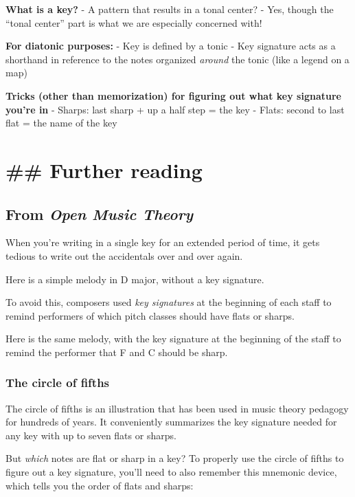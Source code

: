 \documentclass{book}
\begin{document}
\textbf{What is a key?} - A pattern that results in a tonal center? - Yes,
though the ``tonal center'' part is what we are especially concerned with!

\textbf{For diatonic purposes:} - Key is defined by a tonic - Key signature
acts as a shorthand in reference to the notes organized \emph{around} the
tonic (like a legend on a map)

\textbf{Tricks (other than memorization) for figuring out what key signature
you're in} - Sharps: last sharp + up a half step = the key - Flats: second to
last flat = the name of the key

\hypertarget{further-reading-30}{%
\chapter{\#\# Further reading}\label{further-reading-30}}

\hypertarget{from-open-music-theory-29}{%
\section{\texorpdfstring{From \emph{Open Music
Theory}}{From Open Music Theory}}\label{from-open-music-theory-29}}

When you're writing in a single key for an extended period of time, it gets
tedious to write out the accidentals over and over again.

Here is a simple melody in D major, without a key signature.

To avoid this, composers used \emph{key signatures} at the beginning of each
staff to remind performers of which pitch classes should have flats or sharps.

Here is the same melody, with the key signature at the beginning of the staff
to remind the performer that F and C should be sharp.

\hypertarget{the-circle-of-fifths}{%
\subsection{The circle of fifths}\label{the-circle-of-fifths}}

The circle of fifths is an illustration that has been used in music theory
pedagogy for hundreds of years. It conveniently summarizes the key signature
needed for any key with up to seven flats or sharps.

But \emph{which} notes are flat or sharp in a key? To properly use the circle
of fifths to figure out a key signature, you'll need to also remember this
mnemonic device, which tells you the order of flats and sharps:
\end{document}
